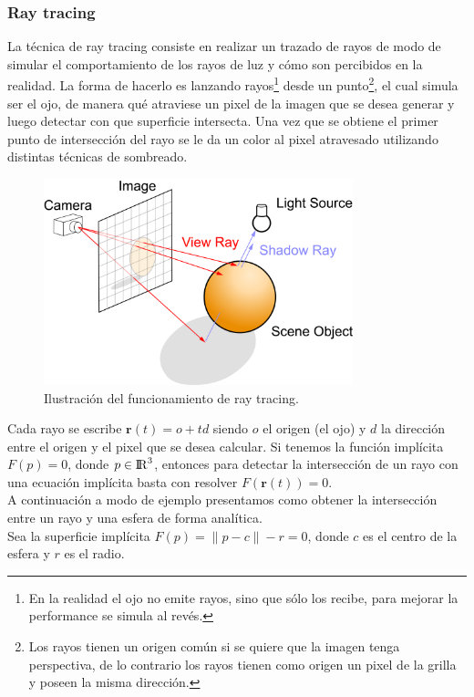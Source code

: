 \documentclass[12pt]{article}
\begin{document}
\subsubsection{Ray tracing}
La técnica de ray tracing consiste en realizar un trazado de rayos de modo de simular el comportamiento de los rayos de luz y cómo son percibidos en la realidad. La forma de hacerlo es lanzando rayos\footnote{En la realidad el ojo no emite rayos, sino que sólo los recibe, para mejorar la performance se simula al revés.} desde un punto\footnote{Los rayos tienen un origen común si se quiere que la imagen tenga perspectiva, de lo contrario los rayos tienen como origen un pixel de la grilla y poseen la misma dirección.}, el cual simula ser el ojo,  de manera qué atraviese un pixel de la imagen que se desea generar y luego detectar con que superficie intersecta. Una vez que se obtiene el primer punto de intersección del rayo se le da un color al pixel atravesado utilizando distintas técnicas de sombreado.
\begin{figure}[h!]
\includegraphics[width=0.8\textwidth,center]{raytrace.png}
\caption{Ilustración del funcionamiento de ray tracing.}
\end{figure}
\clearpage
Cada rayo se escribe $\textbf{r}(t)= o +td$ siendo $o$ el origen (el ojo) y $d$ la dirección entre el origen y el pixel que se desea calcular. Si tenemos la función implícita $F(p)=0$, donde $p \in {\rm I\!R} ^3 $, entonces para detectar la intersección de un rayo con una ecuación implícita basta con resolver $F(\textbf{r}(t))=0$.
\\A continuación a modo de ejemplo presentamos como obtener la intersección entre un rayo y una esfera de forma analítica\cite{realtimerendering}.
\\Sea la superficie implícita $F(p)=\lVert p -c \rVert - r = 0$, donde $c$ es el centro de la esfera y $r$ es el radio.
\end{document}
